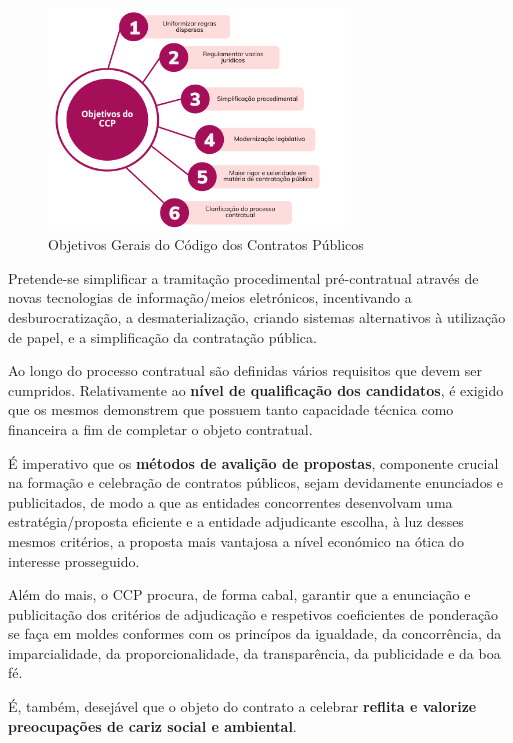 \begin{figure}[H]
	\centering
	\includegraphics[width=0.7\textwidth]{imagens/ccp_objetivos.png}
	\caption{Objetivos Gerais do Código dos Contratos Públicos}
	\label{fig:ccpgoals}
\end{figure}


Pretende-se simplificar a tramitação procedimental pré-contratual através de novas tecnologias de informação/meios eletrónicos, incentivando a desburocratização, a desmaterialização, criando sistemas alternativos à utilização de papel, e a simplificação da contratação pública. 


Ao longo do processo contratual são definidas vários requisitos que devem ser cumpridos.
Relativamente ao \textbf{nível de qualificação dos candidatos}, é exigido que os mesmos demonstrem que possuem tanto capacidade técnica como financeira a fim de completar o objeto contratual. 

É imperativo que os \textbf{métodos de avalição de propostas}, componente crucial na formação e celebração de contratos públicos, sejam devidamente enunciados e publicitados, de modo a que as entidades concorrentes desenvolvam uma estratégia/proposta eficiente e a entidade adjudicante escolha, à luz desses mesmos critérios, a proposta mais vantajosa a nível económico na ótica do interesse prosseguido. 

Além do mais, o CCP procura, de forma cabal, garantir que a enunciação e publicitação dos critérios de adjudicação e respetivos coeficientes de ponderação se faça em moldes conformes com os princípos da igualdade, da concorrência, da imparcialidade, da proporcionalidade, da transparência, da publicidade e da boa fé. 




É, também, desejável que o objeto do contrato a celebrar \textbf{reflita e valorize preocupações de cariz social e ambiental}. 

